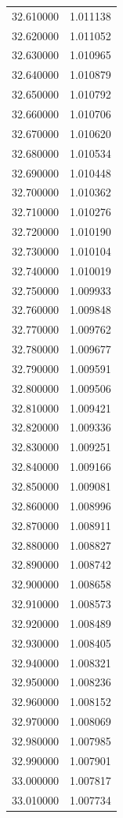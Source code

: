 \begin{tabular}{rr}
32.610000 & 1.011138 \\
32.620000 & 1.011052 \\
32.630000 & 1.010965 \\
32.640000 & 1.010879 \\
32.650000 & 1.010792 \\
32.660000 & 1.010706 \\
32.670000 & 1.010620 \\
32.680000 & 1.010534 \\
32.690000 & 1.010448 \\
32.700000 & 1.010362 \\
32.710000 & 1.010276 \\
32.720000 & 1.010190 \\
32.730000 & 1.010104 \\
32.740000 & 1.010019 \\
32.750000 & 1.009933 \\
32.760000 & 1.009848 \\
32.770000 & 1.009762 \\
32.780000 & 1.009677 \\
32.790000 & 1.009591 \\
32.800000 & 1.009506 \\
32.810000 & 1.009421 \\
32.820000 & 1.009336 \\
32.830000 & 1.009251 \\
32.840000 & 1.009166 \\
32.850000 & 1.009081 \\
32.860000 & 1.008996 \\
32.870000 & 1.008911 \\
32.880000 & 1.008827 \\
32.890000 & 1.008742 \\
32.900000 & 1.008658 \\
32.910000 & 1.008573 \\
32.920000 & 1.008489 \\
32.930000 & 1.008405 \\
32.940000 & 1.008321 \\
32.950000 & 1.008236 \\
32.960000 & 1.008152 \\
32.970000 & 1.008069 \\
32.980000 & 1.007985 \\
32.990000 & 1.007901 \\
33.000000 & 1.007817 \\
33.010000 & 1.007734 \\

\end{tabular}
